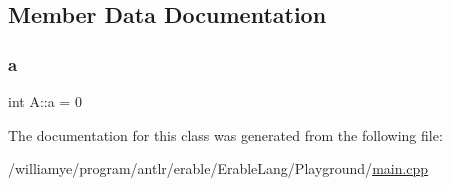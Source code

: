 \subsection{Member Data Documentation}
\mbox{\label{class_a_a49a53415abd8f1b26235579cc805a15f}} 
\subsubsection{\texorpdfstring{a}{a}}
{\footnotesize\ttfamily int A\+::a = 0}



The documentation for this class was generated from the following file\+:\begin{DoxyCompactItemize}
\item 
/williamye/program/antlr/erable/\+Erable\+Lang/\+Playground/\mbox{\hyperlink{_playground_2main_8cpp}{main.\+cpp}}\end{DoxyCompactItemize}
